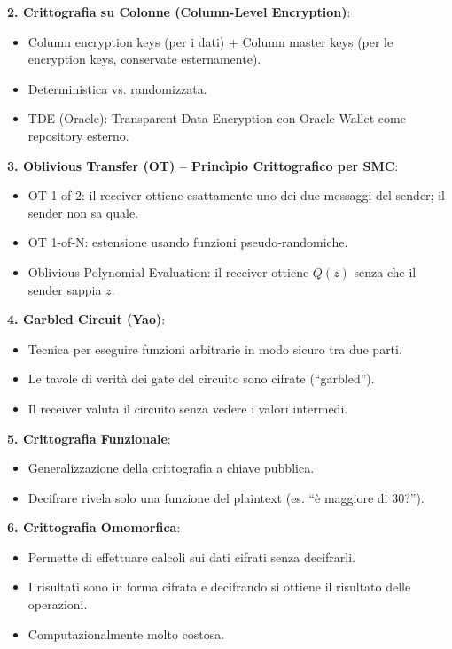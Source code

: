 \documentclass[a4paper,11pt]{article}
\begin{document}
\textbf{2. Crittografia su Colonne (Column-Level Encryption)}:
\begin{itemize}
  \item Column encryption keys (per i dati) + Column master keys (per le encryption keys, conservate esternamente).
  \item Deterministica vs. randomizzata.
  \item TDE (Oracle): Transparent Data Encryption con Oracle Wallet come repository esterno.
\end{itemize}

\textbf{3. Oblivious Transfer (OT) -- Princìpio Crittografico per SMC}:
\begin{itemize}
  \item OT 1-of-2: il receiver ottiene esattamente uno dei due messaggi del sender; il sender non sa quale.
  \item OT 1-of-N: estensione usando funzioni pseudo-randomiche.
  \item Oblivious Polynomial Evaluation: il receiver ottiene $Q(z)$ senza che il sender sappia $z$.
\end{itemize}

\textbf{4. Garbled Circuit (Yao)}:
\begin{itemize}
  \item Tecnica per eseguire funzioni arbitrarie in modo sicuro tra due parti.
  \item Le tavole di verit\`{a} dei gate del circuito sono cifrate (``garbled'').
  \item Il receiver valuta il circuito senza vedere i valori intermedi.
\end{itemize}

\textbf{5. Crittografia Funzionale}:
\begin{itemize}
  \item Generalizzazione della crittografia a chiave pubblica.
  \item Decifrare rivela solo una funzione del plaintext (es. ``\`{e} maggiore di 30?'').
\end{itemize}

\textbf{6. Crittografia Omomorfica}:
\begin{itemize}
  \item Permette di effettuare calcoli sui dati cifrati senza decifrarli.
  \item I risultati sono in forma cifrata e decifrando si ottiene il risultato delle operazioni.
  \item Computazionalmente molto costosa.
\end{itemize}
\end{document}
